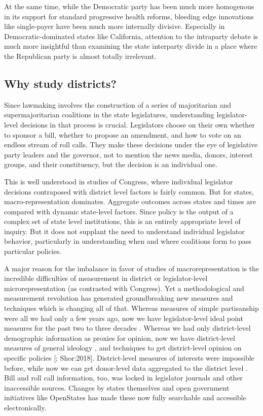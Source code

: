 \documentclass[
  oneside]{book}
\begin{document}
At the same time, while the Democratic party has been much more homogenous in its support for standard progressive health reforms, bleeding edge innovations like single-payer have been much more internally divisive. Especially in Democratic-dominated states like California, attention to the intraparty debate is much more insightful than examining the state interparty divide in a place where the Republican party is almost totally irrelevant.

\hypertarget{why-study-districts}{%
\subsection{Why study districts?}\label{why-study-districts}}

Since lawmaking involves the construction of a series of majoritarian and supermajoritarian coalitions in the state legislatures, understanding legislator-level decisions in that process is crucial. Legislators choose on their own whether to sponsor a bill, whether to propose an amendment, and how to vote on an endless stream of roll calls. They make these decisions under the eye of legislative party leaders and the governor, not to mention the news media, donors, interest groups, and their constituency, but the decision is an individual one.

This is well understood in studies of Congress, where individual legislator decisions contraposed with district level factors is fairly common. But for states, macro-representation dominates. Aggregate outcomes across states and times are compared with dynamic state-level factors. Since policy is the output of a complex set of state level institutions, this is an entirely appropriate level of inquiry. But it does not supplant the need to understand individual legislator behavior, particularly in understanding when and where coalitions form to pass particular policies.

A major reason for the imbalance in favor of studies of macrorepresentation is the incredible difficulties of measurement in district or legislator-level microrepresentation (as contrasted with Congress). Yet a methodological and measurement revolution has generated groundbreaking new measures and techniques which is changing all of that. Whereas measures of simple partisanship were all we had only a few years ago, now we have legislator-level ideal point measures for the past two to three decades \citep{Shor:2011, Shor:2020}. Whereas we had only district-level demographic information as proxies for opinion, now we have district-level measures of general ideology \citep{Tausanovitch:2013}, and techniques to get district-level opinion on specific policies {[}\citet{Warshaw:2012}; Shor:2018{]}. District-level measures of interests were impossible before, while now we can get donor-level data aggregated to the district level \citep{Bonica:2013, Bonica:2017, Bonica:2017a}. Bill and roll call information, too, was locked in legislator journals and other inaccessible sources. Changes by states themselves and open government initiatives like OpenStates has made these now fully searchable and accessible electronically.
\end{document}
